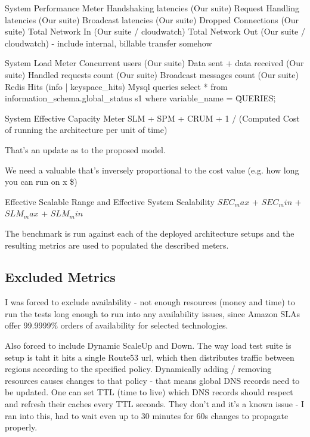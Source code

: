 \documentclass{uvamscse}
\begin{document}
System Performance Meter
Handshaking latencies (Our suite)
Request Handling latencies (Our suite)
Broadcast latencies (Our suite)
Dropped Connections (Our suite)
Total Network In (Our suite / cloudwatch)
Total Network Out (Our suite / cloudwatch) - include internal, billable transfer somehow

System Load Meter
Concurrent users  (Our suite)
Data sent + data received  (Our suite)
Handled requests count (Our suite)
Broadcast messages count (Our suite)
Redis Hits (info | keyspace\_hits)
Mysql queries select * from information\_schema.global\_status s1 where variable\_name = \"QUERIES\";

System Effective Capacity Meter
SLM + SPM + CRUM + 1 / (Computed Cost of running the architecture per unit of time)

That's an update as to the proposed model.

We need a valuable that's inversely proportional to the cost value (e.g. how long you can run on x \$)

Effective Scalable Range and Effective System Scalability
$SEC_max$ + $SEC_min$ + $SLM_max$ + $SLM_min$

The benchmark is run against each of the deployed architecture setups and the resulting metrics are used to populated the described meters.

\subsection{Excluded Metrics}\label{Excluded Metrics}

I was forced to exclude availability - not enough resources (money and time) to run the tests long enough to run into any availability issues, since Amazon SLAs offer 99.9999\% orders of availability for selected technologies.

Also forced to include Dynamic ScaleUp and Down. The way load test suite is setup is taht it hits a single Route53 url, which then distributes traffic between regions according to the specified policy. Dynamically adding / removing resources causes changes to that policy - that means global DNS records need to be updated. One can set TTL (time to live) which DNS records should respect and refresh their caches every TTL seconds. They don't and it's a known issue - I ran into this, had to wait even up to 30 minutes for 60s changes to propagate properly.
\end{document}
